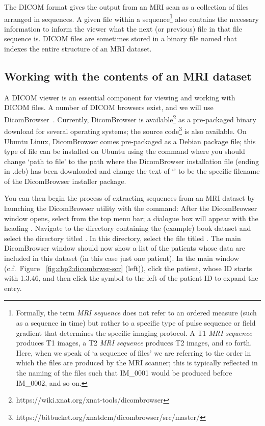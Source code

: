 The DICOM format gives the output from an MRI scan as a collection of
files arranged in sequences. A given file within a sequence\footnote{Formally, 
the term \textit{MRI sequence} does not refer to an ordered measure (such as a 
sequence in time) but rather to a specific type of pulse sequence or field 
gradient that determines the specific imaging protocol. A T1 
\textit{MRI sequence} produces T1 images, a T2 \textit{MRI sequence} produces 
T2 images, and so forth. Here, when we speak of `a sequence of files' we are 
referring to the order in which the files are produced by the MRI scanner; this 
is typically reflected in the naming of the files such that IM\_0001 would be 
produced before IM\_0002, and so on.} also contains the necessary information 
to inform the viewer what the next (or previous) file in that file sequence is. 
DICOM files are sometimes stored in a binary file named  that 
indexes the entire structure of an MRI dataset. 

\subsection{Working with the contents of an MRI dataset}
\label{sec:chp2:viewmri}

A DICOM viewer is an essential component for viewing and working with
DICOM files. A number of DICOM browsers exist, and we will use
DicomBrowser~\cite{dicombrowser}. Currently, DicomBrowser is
available\footnote{https://wiki.xnat.org/xnat-tools/dicombrowser} as a
pre-packaged binary download for several operating systems; the source
code\footnote{https://bitbucket.org/xnatdcm/dicombrowser/src/master/}
is also available. On Ubuntu Linux, DicomBrowser comes pre-packaged
as a Debian package file; this type of file can be installed on
Ubuntu using the command 
\noindent where you should change `path to file' to the path where the  
DicomBrowser installation file (ending in .deb) has been downloaded and change 
the text of `' to be the specific filename of the 
DicomBrowser installer package. 

You can then begin the process of extracting sequences from an MRI
dataset by launching the DicomBrowser utility with the command:
\noindent After the DicomBrowser window opens, select
 from the top menu bar; a dialogue box
will appear with the heading . Navigate to
the directory containing the (example) book dataset and select the directory
titled \emp{\erniedicom}. In this directory, select the file titled
. The main DicomBrowser window should now show a list of
the patients whose data are included in this dataset (in this case
just one patient). In the main window (c.f.~Figure~%
\ref{fig:chp2:dicombrwsr-scr} (left)), click the patient, whose ID starts with 
1.3.46, and then click the symbol to the left of the patient ID to expand the 
entry.

